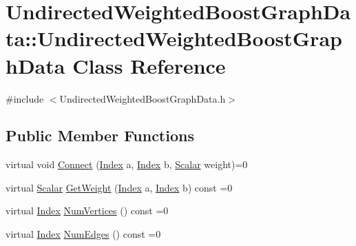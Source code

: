 \hypertarget{class_undirected_weighted_graph_1_1_undirected_weighted_graph}{\section{Undirected\+Weighted\+BoostGraphData\+:\+:Undirected\+Weighted\+BoostGraphData Class Reference}
\label{class_undirected_weighted_graph_1_1_undirected_weighted_graph}
}


{\ttfamily \#include $<$Undirected\+Weighted\+BoostGraphData.\+h$>$}

\subsection*{Public Member Functions}
\begin{DoxyCompactItemize}
\item 
virtual void \hyperlink{class_undirected_weighted_graph_1_1_undirected_weighted_graph_aae320eca34e285123af14776c60fbd4d}{Connect} (\hyperlink{typedefs_8h_a5d7deb06d9443e7d4a47bf078638cc91}{Index} a, \hyperlink{typedefs_8h_a5d7deb06d9443e7d4a47bf078638cc91}{Index} b, \hyperlink{typedefs_8h_a508fc58b5dc3c81865305f6498457063}{Scalar} weight)=0
\item 
virtual \hyperlink{typedefs_8h_a508fc58b5dc3c81865305f6498457063}{Scalar} \hyperlink{class_undirected_weighted_graph_1_1_undirected_weighted_graph_a60a24b6b5018f32f0fcd3d81f7bae3ef}{Get\+Weight} (\hyperlink{typedefs_8h_a5d7deb06d9443e7d4a47bf078638cc91}{Index} a, \hyperlink{typedefs_8h_a5d7deb06d9443e7d4a47bf078638cc91}{Index} b) const =0
\item 
virtual \hyperlink{typedefs_8h_a5d7deb06d9443e7d4a47bf078638cc91}{Index} \hyperlink{class_undirected_weighted_graph_1_1_undirected_weighted_graph_ac5a7274fc4505312a1bb5eade12d33fe}{Num\+Vertices} () const =0
\item 
virtual \hyperlink{typedefs_8h_a5d7deb06d9443e7d4a47bf078638cc91}{Index} \hyperlink{class_undirected_weighted_graph_1_1_undirected_weighted_graph_a9f0a1cd1b73f75ab5738527a4acb0381}{Num\+Edges} () const =0
\end{DoxyCompactItemize}



